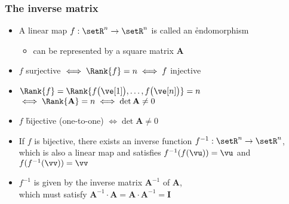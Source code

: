 \begin{frame}
  \frametitle{The inverse matrix}

  \begin{itemize}
  \item A linear map $f: \setR^n \to \setR^n$ is called an \h{endomorphism}
    \begin{itemize}
    \item can be represented by a square matrix $\mathbf{A}$
    \end{itemize}
    \pause\gap
  \item $f$ surjective $\iff \Rank{f} = n \iff f$ injective
  \item $\Rank{f} = \Rank{f\bigl(\ve[1]\bigr), \ldots, f\bigl(\ve[n]\bigr)} = n$\\
    $\iff \Rank{\mathbf{A}} = n \iff \det \mathbf{A} \neq 0$%
    \pause
  \item[\So] $f$ \h{bijective} (one-to-one) $\iff \det \mathbf{A} \neq 0$%
    \pause\gap
  \item If $f$ is bijective, there exists an inverse function $f^{-1}:
    \setR^n\to \setR^n$, which is also a linear map and satisfies
    $f^{-1}(f(\vu)) = \vu$ and $f(f^{-1}(\vv)) = \vv$
  \item $f^{-1}$ is given by the \h{inverse matrix} $\mathbf{A}^{-1}$ of $\mathbf{A}$,\\
    which must satisfy $\mathbf{A}^{-1}\cdot \mathbf{A} = \mathbf{A}\cdot
    \mathbf{A}^{-1} = \mathbf{I}$
  \end{itemize}
\end{frame}

